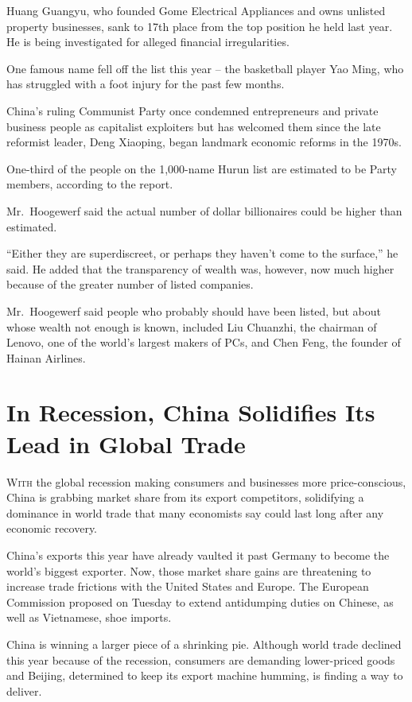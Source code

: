 ﻿\documentclass[12pt]{article}
\begin{document}
Huang Guangyu, who founded Gome Electrical Appliances and owns unlisted property businesses, sank to
17th place from the top position he held last year. He is being investigated for alleged financial
irregularities.

One famous name fell off the list this year -- the basketball player Yao Ming, who has struggled
with a foot injury for the past few months.

China's ruling Communist Party once condemned entrepreneurs and private business people as
capitalist exploiters but has welcomed them since the late reformist leader, Deng Xiaoping, began
landmark economic reforms in the 1970s.

One-third of the people on the 1,000-name Hurun list are estimated to be Party members, according to
the report.

Mr.~Hoogewerf said the actual number of dollar billionaires could be higher than estimated.

``Either they are superdiscreet, or perhaps they haven't come to the surface,'' he said. He added
that the transparency of wealth was, however, now much higher because of the greater number of
listed companies.

Mr.~Hoogewerf said people who probably should have been listed, but about whose wealth not enough is
known, included Liu Chuanzhi, the chairman of Lenovo, one of the world's largest makers of PCs, and
Chen Feng, the founder of Hainan Airlines.

\section{In Recession, China Solidifies Its Lead in Global Trade}

\lettrine{W}{ith} the global recession making consumers and businesses more
price-conscious, China is grabbing market share from its export competitors, solidifying a dominance
in world trade that many economists say could last long after any economic recovery.

China's exports this year have already vaulted it past Germany to become the world's biggest
exporter. Now, those market share gains are threatening to increase trade frictions with the United
States and Europe. The European Commission proposed on Tuesday to extend antidumping duties on
Chinese, as well as Vietnamese, shoe imports.

China is winning a larger piece of a shrinking pie. Although world trade declined this year because
of the recession, consumers are demanding lower-priced goods and Beijing, determined to keep its
export machine humming, is finding a way to deliver.
\end{document}
